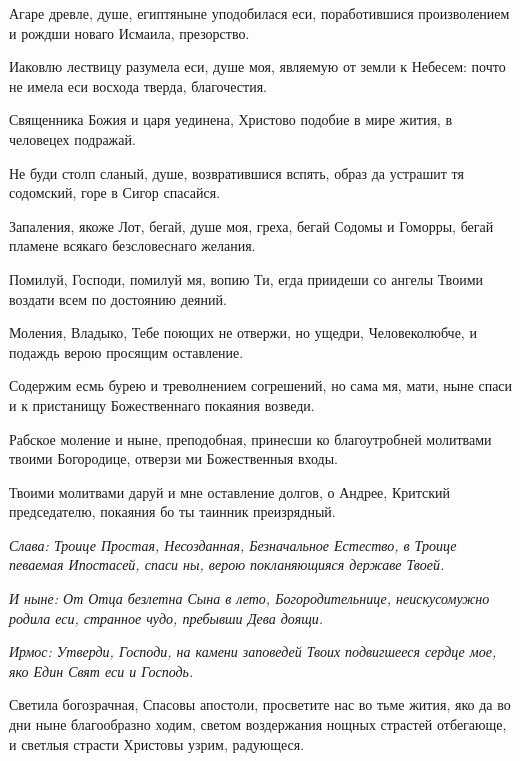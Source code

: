 Агаре древле, душе, египтяныне уподобилася еси, поработившися произволением и рождши новаго Исмаила, презорство.


Иаковлю лествицу разумела еси, душе моя, являемую от земли к Небесем: почто не имела еси восхода тверда, благочестия.


Священника Божия и царя уединена, Христово подобие в мире жития, в человецех подражай.


Не буди столп сланый, душе, возвратившися вспять, образ да устрашит тя содомский, горе в Сигор спасайся.


Запаления, якоже Лот, бегай, душе моя, греха, бегай Содомы и Гоморры, бегай пламене всякаго безсловеснаго желания.


Помилуй, Господи, помилуй мя, вопию Ти, егда приидеши со ангелы Твоими воздати всем по достоянию деяний.


Моления, Владыко, Тебе поющих не отвержи, но ущедри, Человеколюбче, и подаждь верою просящим оставление.




Содержим есмь бурею и треволнением согрешений, но сама мя, мати, ныне спаси и к пристанищу Божественнаго покаяния возведи.




Рабское моление и ныне, преподобная, принесши ко благоутробней молитвами твоими Богородице, отверзи ми Божественныя входы.




Твоими молитвами даруй и мне оставление долгов, о Андрее, Критский председателю, покаяния бо ты таинник преизрядный.


\itshape Слава\normalfont{}: Троице Простая, Несозданная, Безначальное Естество, в Троице певаемая Ипостасей, спаси ны, верою покланяющияся державе Твоей.


\itshape И ныне\normalfont{}: От Отца безлетна Сына в лето, Богородительнице, неискусомужно родила еси, странное чудо, пребывши Дева доящи.


\itshape Ирмос\normalfont{}: Утверди, Господи, на камени заповедей Твоих подвигшееся сердце мое, яко Един Свят еси и Господь. 



Светила богозрачная, Спасовы апостоли, просветите нас во тьме жития, яко да во дни ныне благообразно ходим, светом воздержания нощных страстей отбегающе, и светлыя страсти Христовы узрим, радующеся. 

